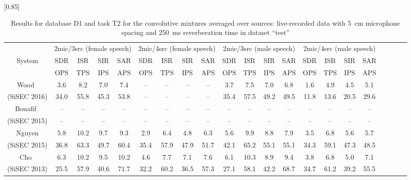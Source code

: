 \documentclass{article}
\begin{document}
\begin{table*}[t]
	\caption{Results for database D1 and task T2 for the convolutive mixtures averaged over sources: 
live-recorded data with 5~cm microphone spacing and 250~ms reverberation time in dataset ``test''}
	\vspace{-5pt}
	\begin{center}
	\scalebox{0.85}[0.85]{ %
		\begin{tabular}{|c|cccc|cccc|cccc|cccc|cccc|} \hline
			\multicolumn{1}{|c|}{}					& \multicolumn{4}{c|}{2mic/3src (female speech)}	& \multicolumn{4}{c|}{2mic/4src (female speech)}	& \multicolumn{4}{c|}{2mic/3src (male speech)} & \multicolumn{4}{c|}{2mic/4src (male speech)}\\
			\multicolumn{1}{|c|}{System}				&	SDR	&	ISR	& SIR	&	SAR			&	SDR	&	ISR &	SIR	&	SAR			&	SDR	&	ISR	&	SIR	&	SAR		&	SDR	&	ISR	&	SIR	&	SAR	\\
			\multicolumn{1}{|c|}{}					&	OPS	&	TPS	&	IPS	&	APS			&	OPS	&	TPS	&	IPS	&	APS			&	OPS	&	TPS	&	IPS	&	APS		&	OPS	&	TPS	&	IPS	&	APS	\\ \hline \hline
			\multirow{1}{*}{Wood~\cite{Wood}}		&	3.6	&	8.2	&	7.0	&	7.4			&	--	&	--	&	--	&	--			&	3.7	&	7.5	&	7.0	&	6.8		&	1.6	&	4.9	&	4.5	&	5.1	\\
			\multirow{1}{*}{(SiSEC 2016)}			&	34.0	&	55.8	&	45.3	&	53.8			&	--	&	--	&	--	&	--			&	35.4	&	57.5	&	49.2	&	49.5		&	11.8	&	13.6	&	20.5	&	29.6	\\ \hline
			\multirow{1}{*}{Bouafif~\cite{Bouafif}}		&	--	&	--	&	--	&	--			&	--	&	--	&	--	&	--			&	--	&	--	&	--	&	--		&	--	&	--	&	--	&	--	\\
			\multirow{1}{*}{(SiSEC 2015)}			&	--	&	--	&	--	&	--			&	--	&	--	&	--	&	--			&	--	&	--	&	--	&	--		&	--	&	--	&	--	&	--	\\ \hline
			\multirow{1}{*}{Nguyen}					&	5.8	&	10.2	&	9.7	&	9.3			&	2.9	&	6.4	&	4.8	&	6.3			&	5.6	&	9.9	&	8.8	&	7.9		&	3.5	&	6.8	&	5.6	&	5.7	\\
			\multirow{1}{*}{(SiSEC 2015)}			&	36.8	&	63.3	&	49.7	&	60.4			&	35.4	&	57.9	&	47.9	&	51.7			&	42.1	&	65.2	&	55.1	&	55.1		&	34.3	&	59.1	&	47.3	&	48.5	\\ \hline
			\multirow{1}{*}{Cho~\cite{Cho1}}			&	6.3	&	10.2	&	9.5	&	10.2			&	4.6	&	7.7	&	7.1	&	7.6			&	6.1	&	10.3	&	8.9	&	9.4		&	3.8	&	6.8	&	5.0	&	7.1	\\
			\multirow{1}{*}{(SiSEC 2013)}			&	25.5	&	57.9	&	40.6	&	71.7			&	32.2	&	60.2	&	36.5	&	57.3			&	27.1	&	58.1	&	42.2	&	68.7		&	34.7	&	61.2	&	39.2	&	55.5	\\ \hline

\end{tabular}}
\end{center}
\end{table*}
\end{document}
